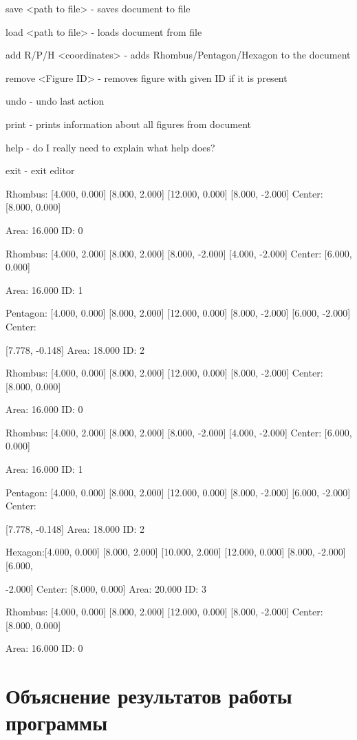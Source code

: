 \documentclass[a4paper, 12pt]{article}
\begin{document}
save <path to file> - saves document to file

load <path to file> - loads document from file

add R/P/H <coordinates> - adds Rhombus/Pentagon/Hexagon to the document

remove <Figure ID> - removes figure with given ID if it is present

undo - undo last action

print - prints information about all figures from document

help - do I really need to explain what help does?

exit - exit editor

Rhombus: [4.000, 0.000] [8.000, 2.000] [12.000, 0.000] [8.000, -2.000] Center: [8.000, 0.000] 

Area: 16.000 ID: 0

Rhombus: [4.000, 2.000] [8.000, 2.000] [8.000, -2.000] [4.000, -2.000] Center: [6.000, 0.000] 

Area: 16.000 ID: 1

Pentagon: [4.000, 0.000] [8.000, 2.000] [12.000, 0.000] [8.000, -2.000] [6.000, -2.000] Center: 

[7.778, -0.148] Area: 18.000 ID: 2

Rhombus: [4.000, 0.000] [8.000, 2.000] [12.000, 0.000] [8.000, -2.000] Center: [8.000, 0.000] 

Area: 16.000 ID: 0

Rhombus: [4.000, 2.000] [8.000, 2.000] [8.000, -2.000] [4.000, -2.000] Center: [6.000, 0.000] 

Area: 16.000 ID: 1

Pentagon: [4.000, 0.000] [8.000, 2.000] [12.000, 0.000] [8.000, -2.000] [6.000, -2.000] Center: 

[7.778, -0.148] Area: 18.000 ID: 2

Hexagon:[4.000, 0.000] [8.000, 2.000] [10.000, 2.000] [12.000, 0.000] [8.000, -2.000] [6.000, 

-2.000] Center: [8.000, 0.000] Area: 20.000 ID: 3

Rhombus: [4.000, 0.000] [8.000, 2.000] [12.000, 0.000] [8.000, -2.000] Center: [8.000, 0.000] 

Area: 16.000 ID: 0

\section{Объяснение результатов работы программы}
\end{document}
